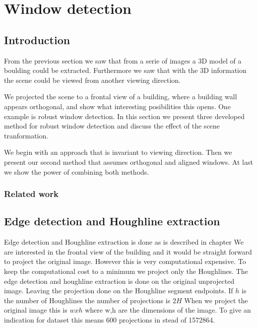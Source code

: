 \section{Window detection}
\label{chap:windowDetection}
\subsection{Introduction}
From the previous section we saw that from a serie of images a 3D model of a
boulding could be extracted. Furthermore we saw that with the 3D information the
scene could be viewed from another viewing direction. 

We projected the scene to a frontal view of a building, where a building wall appears
orthogonal, and show what interesting posibilities this opens.
One example is robust window detection.
In this section we present three developed method for robust window detection
and discuss the effect of the scene tranformation.

We begin with an approach that is invariant to viewing direction.
Then we present our second method that assumes orthogonal and aligned windows.
At last we show the power of combining both methods.


\subsubsection{Related work}

\subsection{Edge detection and Houghline extraction} 
Edge detection and Houghline extraction is done as is described in chapter
We are interested in the frontal view of the building and it would be straight
forward to project the original image. However this is very computational
expensive. To keep the computational cost to a minimum we project only the
Houghlines. The edge detection and houghline extraction is done on the original
unprojected image. Leaving the projection done on the Houghline segment
endpoints. If $h$ is the number of Houghlines the number of projections is $2H$
When we project the original image this is $wxh$ where w,h are the dimensions of
the image. To give an indication for dataset %
this means 600 projections in stead of 1572864.

